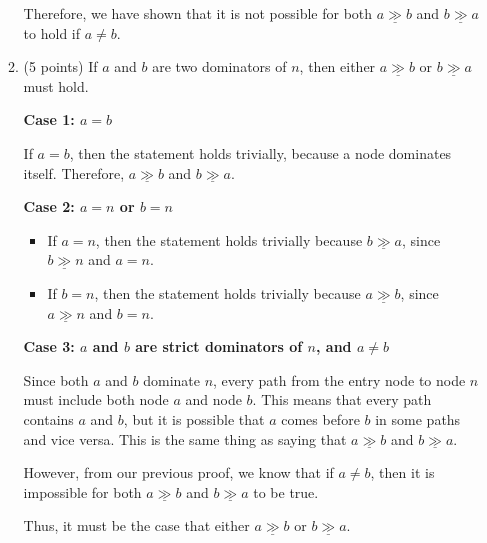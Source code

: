 \documentclass[12pt]{article}
\newcommand{\dom}{\underline{\gg}}
\begin{document}
\begin{enumerate}
\begin{enumerate}
\begin{mdframed}
          \medskip

          Therefore, we have shown that it is not possible for both \( a \dom b \) and \( b \dom a \) to hold if \( a \neq b \).

        \end{mdframed}

        \item (5 points) If $a$ and $b$ are two dominators of $n$, then either
        $a \dom b$ or $b \dom a$ must hold.
        \begin{mdframed}
          \textbf{Case 1: \( a = b \)}

          If \( a = b \), then the statement holds trivially, because a node dominates itself.  
          Therefore, \( a \dom b \) and \( b \dom a \).

          \medskip

          \textbf{Case 2: \( a = n \) or \( b = n \)}

          \begin{itemize}
              \item If \( a = n \), then the statement holds trivially because \( b \dom a \), since \( b \dom n \) and \( a = n \).
              \item If \( b = n \), then the statement holds trivially because \( a \dom b \), since \( a \dom n \) and \( b = n \).
          \end{itemize}

          \medskip

          \textbf{Case 3: \( a \) and \( b \) are strict dominators of \( n \), and \( a \neq b \)}

          Since both \( a \) and \( b \) dominate \( n \), every path from the entry node to node \( n \) must include both node \( a \) and node \( b \).
          This means that every path contains \( a \) and \( b \), but it is possible that \( a \) comes before \( b \) in some paths and vice versa. 
          This is the same thing as saying that $a \dom b$ and $b \dom a$.

          \medskip

          However, from our previous proof, we know that if \( a \neq b \), then it is impossible for both \( a \dom b \) and \( b \dom a \) to be true.

          \medskip

          Thus, it must be the case that either \( a \dom b \) or \( b \dom a \).


\end{mdframed}
\end{enumerate}
\end{enumerate}
\end{document}
